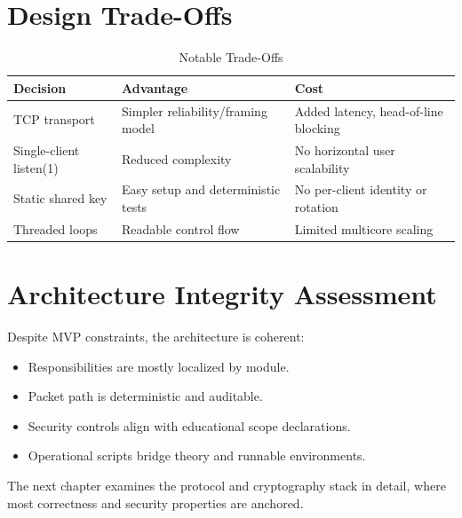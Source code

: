 \section{Design Trade-Offs}
\begin{table}[H]
\centering
\caption{Notable Trade-Offs}
\begin{tabular}{p{}p{}p{}}
\toprule
\textbf{Decision} & \textbf{Advantage} & \textbf{Cost} \\
\midrule
TCP transport & Simpler reliability/framing model & Added latency, head-of-line blocking \\
Single-client listen(1) & Reduced complexity & No horizontal user scalability \\
Static shared key & Easy setup and deterministic tests & No per-client identity or rotation \\
Threaded loops & Readable control flow & Limited multicore scaling \\
\bottomrule
\end{tabular}
\end{table}

\section{Architecture Integrity Assessment}
Despite MVP constraints, the architecture is coherent:
\begin{itemize}[leftmargin=2em]
\item Responsibilities are mostly localized by module.
\item Packet path is deterministic and auditable.
\item Security controls align with educational scope declarations.
\item Operational scripts bridge theory and runnable environments.
\end{itemize}

The next chapter examines the protocol and cryptography stack in detail, where most correctness and security properties are anchored.
